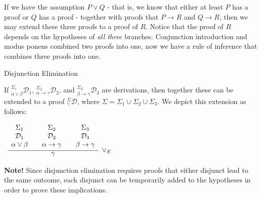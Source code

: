 \documentclass{book}
\begin{document}
    If we have the assumption $P \lor Q$ - that is, we know that either at least $P$ has a proof or $Q$ has a proof - together with proofs that $P \to R$ and $Q \to R$, then we may extend these three proofs to a proof of $R$. Notice that the proof of $R$ depends on the hypotheses of \emph{all three} branches. Conjunction introduction and modus ponens combined two proofs into one, now we have a rule of inference that combines three proofs into one. 

    \begin{definition}{Disjunction Elimination}

        If $^{\Sigma_{1}}_{\alpha\lor\beta}\mathcal{D}_{1}$, $^{\Sigma_{2}}_{\alpha\rightarrow\gamma}\mathcal{D}_{2}$, and $^{\Sigma_{2}}_{\beta\rightarrow\gamma}\mathcal{D}_{3}$ are derivations, then together these can be extended to a proof $^{\Sigma}_{\gamma}\mathcal{D}$, where $\Sigma = \Sigma_{1} \cup \Sigma_{2} \cup \Sigma_{3}$. We depict this extension as follows: 

        \begin{center}
            $\begin{array}{ c }
	
                \infer[\lor_{E}]{\gamma}
                    {
                    \begin{array}{c} \Sigma_{1}  \\ \mathcal{D}_{1} \\ \alpha\lor\beta \end{array}
                     & 
                    \begin{array}{c} \Sigma_{2}  \\ \mathcal{D}_{2} \\ \alpha\rightarrow\gamma \end{array}				
                     & 
                    \begin{array}{c} \Sigma_{3}  \\ \mathcal{D}_{3} \\ \beta\rightarrow\gamma \end{array}				 
                    }	
            
            \end{array}$            
        \end{center}
    \end{definition}

    {\bf Note!} Since disjunction elimination requires proofs that either disjunct lead to the same outcome, each disjunct can be temporarily added to the hypotheses in order to prove these implications. 
\end{document}
